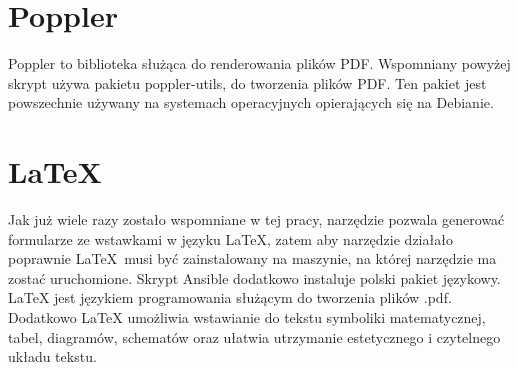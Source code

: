 \section{Poppler}
Poppler\cite{poppler} to biblioteka służąca do renderowania plików PDF. Wspomniany powyżej skrypt
używa pakietu poppler-utils, do tworzenia plików PDF. Ten pakiet jest powszechnie
używany na systemach operacyjnych opierających się na Debianie.

\section{LaTeX}
Jak już wiele razy zostało wspomniane w tej pracy, narzędzie pozwala generować formularze ze 
wstawkami
w języku \LaTeX\cite{latex}, zatem aby narzędzie działało poprawnie \LaTeX\ musi być zainstalowany 
na maszynie, na której narzędzie ma zostać uruchomione. Skrypt Ansible dodatkowo instaluje
polski pakiet językowy.\\
\LaTeX{} jest  językiem programowania służącym do tworzenia plików \*.pdf. Dodatkowo \LaTeX{}
umożliwia wstawianie do tekstu symboliki matematycznej, tabel, diagramów, schematów
oraz ułatwia utrzymanie estetycznego i czytelnego układu tekstu.


